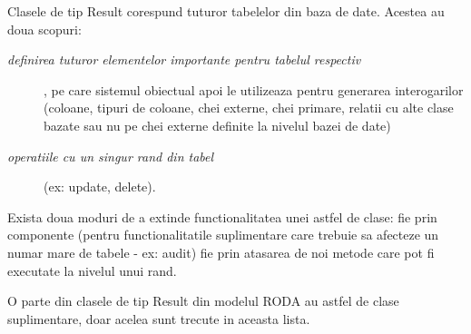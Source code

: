 Clasele de tip Result corespund tuturor tabelelor din baza de date. Acestea au doua scopuri:

\begin{description}

\item[{\textit{definirea tuturor elementelor importante pentru tabelul respectiv} }] , pe care sistemul obiectual apoi le utilizeaza pentru generarea interogarilor (coloane, tipuri de coloane, chei externe, chei primare, relatii cu alte clase bazate sau nu pe chei externe definite la nivelul bazei de date) 

\item[{\textit{operatiile cu un singur rand din tabel} }]  (ex: update, delete). 

\end{description}

Exista doua moduri de a extinde functionalitatea unei astfel de clase: fie prin componente (pentru functionalitatile suplimentare care trebuie sa afecteze un numar mare de tabele - ex: audit) fie prin atasarea de noi metode care pot fi executate la nivelul unui rand. 

O parte din clasele de tip Result din modelul RODA au astfel de clase suplimentare, doar acelea sunt trecute in aceasta lista. 
